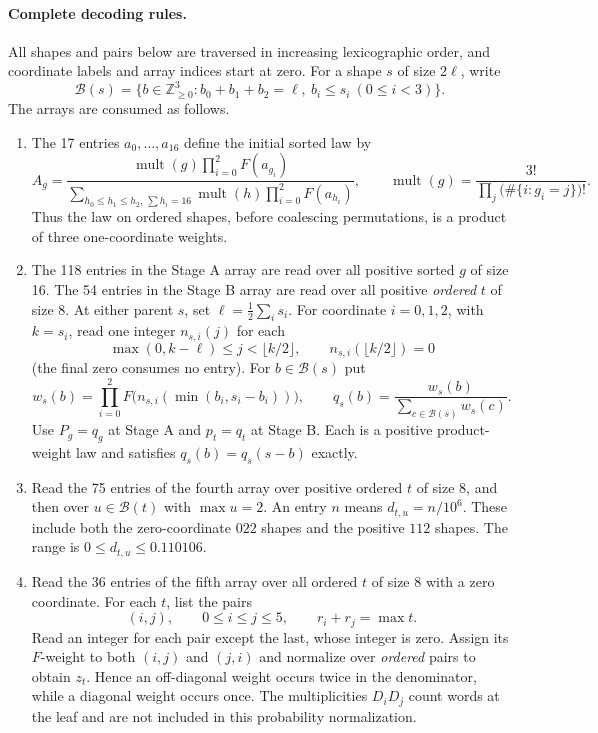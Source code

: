 \paragraph{Complete decoding rules.}
All shapes and pairs below are traversed in increasing lexicographic order,
and coordinate labels and array indices start at zero. For a shape $s$ of
size $2\ell$, write
\[
 \mathcal B(s)=\{b\in\mathbb Z_{\ge0}^3:
          b_0+b_1+b_2=\ell,\ b_i\le s_i\ (0\le i<3)\}.
\]
The arrays are consumed as follows.
\begin{enumerate}
\item The 17 entries $a_0,\ldots,a_{16}$ define the initial sorted law by
\[
 A_g=\frac{\operatorname{mult}(g)\prod_{i=0}^2F(a_{g_i})}
 {\sum_{h_0\le h_1\le h_2,\,\sum h_i=16}
             \operatorname{mult}(h)\prod_{i=0}^2F(a_{h_i})},
 \qquad
 \operatorname{mult}(g)=\frac{3!}{\prod_j\bigl(\#\{i:g_i=j\}\bigr)!}.
\]
Thus the law on ordered shapes, before coalescing permutations, is a product
of three one-coordinate weights.
\item The 118 entries in the Stage A array are read over all positive sorted
$g$ of size 16. The 54 entries in the Stage B array are read over all positive
\emph{ordered} $t$ of size 8. At either parent $s$, set
$\ell=\frac12\sum_i s_i$. For coordinate $i=0,1,2$, with $k=s_i$, read one
integer $n_{s,i}(j)$ for each
\[
 \max(0,k-\ell)\le j<\lfloor k/2\rfloor,
 \qquad n_{s,i}(\lfloor k/2\rfloor)=0
\]
(the final zero consumes no entry). For $b\in\mathcal B(s)$ put
\[
 w_s(b)=\prod_{i=0}^2F\bigl(n_{s,i}(\min(b_i,s_i-b_i))\bigr),
 \qquad q_s(b)=\frac{w_s(b)}{\sum_{c\in\mathcal B(s)}w_s(c)}.
\]
Use $P_g=q_g$ at Stage A and $p_t=q_t$ at Stage B. Each is a positive
product-weight law and satisfies $q_s(b)=q_s(s-b)$ exactly.
\item Read the 75 entries of the fourth array over positive ordered $t$ of
size 8, and then over $u\in\mathcal B(t)$ with $\max u=2$. An entry $n$
means $d_{t,u}=n/10^6$. These include both the zero-coordinate $022$ shapes
and the positive $112$ shapes. The range is $0\le d_{t,u}\le0.110106$.
\item Read the 36 entries of the fifth array over all ordered $t$ of size 8
with a zero coordinate. For each $t$, list the pairs
\[
 (i,j),\qquad 0\le i\le j\le5,\qquad r_i+r_j=\max t.
\]
Read an integer for each pair except the last, whose integer is zero.
Assign its $F$-weight to both $(i,j)$ and $(j,i)$ and normalize over
\emph{ordered} pairs to obtain $z_t$. Hence an off-diagonal weight occurs
twice in the denominator, while a diagonal weight occurs once. The
multiplicities $D_iD_j$ count words at the leaf and are not included in this
probability normalization.
\end{enumerate}

